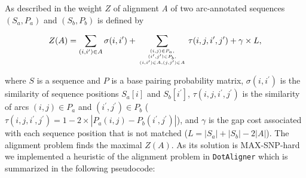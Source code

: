 \documentclass[a4paper,twoside]{article}
\newcommand\dotaligner{\texttt{DotAligner}}
\begin{document}
As described in \cite{Palu2010} the weight $Z$ of alignment \emph{A} of two
arc-annotated sequences $(S_a,P_a)$ and $(S_b,P_b)$ is defined by

\begin{equation}\label{eq1}
	Z(A) = \sum_{(i,i^\prime) \in A} \sigma(i,i^\prime) + \sum_{(i,j) \in
	P_a,\atop {(i^\prime,j^\prime) \in P_b,\atop {(i,i^\prime) \in
	A, (j,j^\prime) \in A}}} \tau(i,j,i^\prime,j^\prime) + \gamma
	\times L,
\end{equation}

where $S$ is a sequence and $P$ is a base pairing probability matrix,
$\sigma(i,i^\prime)$ is the similarity of sequence positions $S_a[i]$ and
$S_b[i^\prime]$, $\tau(i,j,i^\prime,j^\prime)$ is the similarity of arcs $(i,j)
\in P_a$ and $(i^\prime,j^\prime) \in P_b$ ($\tau(i,j,i^\prime,j^\prime) = 1 -
2 \times | P_a(i,j)-P_b(i^\prime,j^\prime) |$), and $\gamma$ is the gap cost
associated with each sequence position that is not matched ($L =
|S_a|+|S_b|-2|A|$). The alignment problem finds the maximal $Z(A)$. As its
solution is MAX-SNP-hard we implemented a heuristic of the alignment problem in
\dotaligner{} which is summarized in the following pseudocode:
\end{document}
